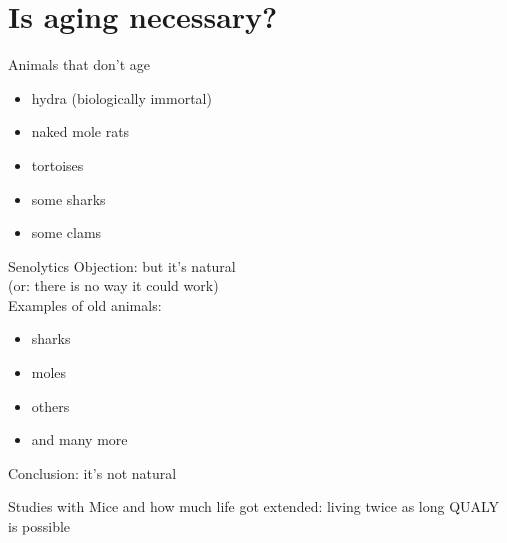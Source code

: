 \section{Is aging necessary?}


\begin{frame}[c]{Animals that don't age}
    \large
    \begin{itemize}[<+(1)->]
        \item hydra (biologically immortal) \cite{martinez1998mortality}
        \item naked mole rats \cite{ruby2018naked}
        \item tortoises \cite{miller2001escaping}
        \item some sharks \cite{Greenlan67:online}
        \item some clams \cite{munro2012extreme}
    \end{itemize}
\end{frame}

\begin{frame}[c]{Senolytics}
    Objection: but it's natural \\
    (or: there is no way it could work) \\
    Examples of old animals: \\
    
    \begin{itemize}[<+(1)->]
        \item sharks
        \item moles
        \item others
        \item and many more
    \end{itemize}
    Conclusion: it's not natural
\end{frame}



\begin{frame}[c]{Studies with Mice}
    and how much life got extended: living twice as long QUALY is possible
\end{frame}
